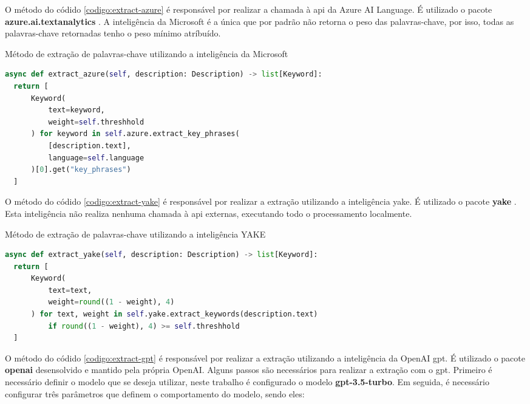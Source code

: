 O método do códido \ref{codigo:extract-azure} é responsável por realizar a chamada à \gls{api} da Azure AI Language. É utilizado o pacote \textbf{azure.ai.textanalytics} \cite{Alcarlucci2023}. A inteligência da Microsoft é a única que por padrão não retorna o peso das palavras-chave, por isso, todas as palavras-chave retornadas tenho o peso mínimo atríbuído.

\begin{sourcecode}[htb]
  \caption{\label{codigo:extract-azure}Método de extração de palavras-chave utilizando a inteligência da Microsoft}
  \begin{lstlisting}[frame=single, language=Python]
async def extract_azure(self, description: Description) -> list[Keyword]:
  return [
      Keyword(
          text=keyword, 
          weight=self.threshhold
      ) for keyword in self.azure.extract_key_phrases(
          [description.text], 
          language=self.language
      )[0].get("key_phrases")
  ]
\end{lstlisting}
  \fonte{}
\end{sourcecode}

O método do códido \ref{codigo:extract-yake} é responsável por realizar a extração utilizando a inteligência \gls{yake}. É utilizado o pacote \textbf{yake} \cite{LiaadYake2023}. Esta inteligência não realiza nenhuma chamada à \gls{api} externas, executando todo o processamento localmente.

\begin{sourcecode}[htb]
  \caption{\label{codigo:extract-yake}Método de extração de palavras-chave utilizando a inteligência YAKE}
  \begin{lstlisting}[frame=single, language=Python]
async def extract_yake(self, description: Description) -> list[Keyword]:
  return [
      Keyword(
          text=text, 
          weight=round((1 - weight), 4)
      ) for text, weight in self.yake.extract_keywords(description.text)
          if round((1 - weight), 4) >= self.threshhold
  ]
\end{lstlisting}
  \fonte{}
\end{sourcecode}

O método do códido \ref{codigo:extract-gpt} é responsável por realizar a extração utilizando a inteligência da OpenAI \gls{gpt}. É utilizado o pacote \textbf{openai} desensolvido e mantido pela própria OpenAI. Alguns passos são necessários para realizar a extração com o \gls{gpt}. Primeiro é necessário definir o modelo que se deseja utilizar, neste trabalho é configurado o modelo \textbf{gpt-3.5-turbo}. Em seguida, é necessário configurar três parâmetros que definem o comportamento do modelo, sendo eles:

